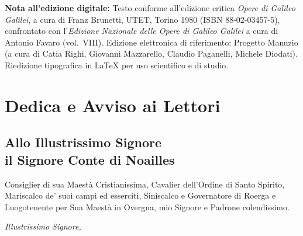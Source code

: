 \documentclass[11pt,twoside,openany]{book}
\begin{document}
\vfill
\begin{footnotesize}
\noindent\textbf{Nota all'edizione digitale:} Testo conforme all'edizione critica \emph{Opere di Galileo Galilei}, a cura di Franz Brunetti, UTET, Torino 1980 (ISBN 88-02-03457-5), confrontato con l'\emph{Edizione Nazionale delle Opere di Galileo Galilei} a cura di Antonio Favaro (vol.~VIII). Edizione elettronica di riferimento: Progetto Manuzio (a cura di Catia Righi, Giovanni Mazzarello, Claudio Paganelli, Michele Diodati). Riedizione tipografica in \LaTeX{} per uso scientifico e di studio.
\end{footnotesize}

\tableofcontents

\chapter*{Dedica e Avviso ai Lettori}
\section*{Allo Illustrissimo Signore\\il Signore Conte di Noailles}
Consiglier di sua Maestà Cristianissima, Cavalier dell'Ordine di Santo Spirito, Mariscalco de' suoi campi ed esserciti, Siniscalco e Governatore di Roerga e Luogotenente per Sua Maestà in Overgna, mio Signore e Padrone colendissimo.

\emph{Illustrissimo Signore,}
\end{document}
